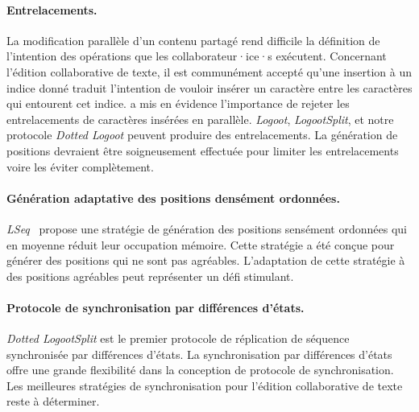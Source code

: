 \paragraph{Entrelacements.} La modification parallèle d'un contenu partagé rend difficile la définition de l'intention des opérations que les collaborateur·ice·s exécutent.
Concernant l'édition collaborative de texte, il est communément accepté qu'une insertion à un indice donné traduit l'intention de vouloir insérer un caractère entre les caractères qui entourent cet indice.
\textcite{kleppmann2019_interleaving} a mis en évidence l'importance de rejeter les entrelacements de caractères insérées en parallèle.
\emph{Logoot}, \emph{LogootSplit}, et notre protocole \emph{Dotted Logoot} peuvent produire des entrelacements.
La génération de positions devraient être soigneusement effectuée pour limiter les entrelacements voire les éviter complètement.

\paragraph{Génération adaptative des positions densément ordonnées.} \emph{LSeq}~\autocite{nedelec_2013_lseq} propose une stratégie de génération des positions sensément ordonnées qui en moyenne réduit leur occupation mémoire.
Cette stratégie a été conçue pour générer des positions qui ne sont pas agréables.
L'adaptation de cette stratégie à des positions agréables peut représenter un défi stimulant.

\paragraph{Protocole de synchronisation par différences d'états.} \emph{Dotted LogootSplit} est le premier protocole de réplication de séquence synchronisée par différences d'états.
La synchronisation par différences d'états offre une grande flexibilité dans la conception de protocole de synchronisation.
Les meilleures stratégies de synchronisation pour l'édition collaborative de texte reste à déterminer.
